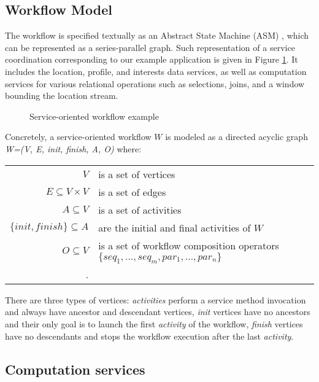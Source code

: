 \subsection{Workflow Model}\label{subsec:workflowModel}

The workflow is specified textually as an Abstract State Machine (ASM) \cite{Gurevich:1995:EAL:233976.233979}, which can be represented as a series-parallel graph. Such representation of a service coordination corresponding to our example application is given in Figure \ref{fig:servCoorExample}. It includes the location, profile, and interests data services, as well as computation services for various relational operations such as selections, joins, and a window bounding the location stream.
		
\begin{figure}
	\centering
		\caption{Service-oriented workflow example}
		\label{fig:servCoorExample}
\end{figure}

Concretely, a service-oriented workflow $W$ is modeled as a directed acyclic graph \textit{W=(V, E, init, finish, A, O)} where:
		\begin{center}
			\footnotesize
			\begin{tabular}{rp{5.5cm}}
				$V$                      & is a set of vertices \\
				$E \subseteq V \times V$ & is a set of edges \\
				$A \subseteq V$          & is a set of activities \\
				$\{init, finish\} \subseteq A$     & are the initial and final activities of $W$\\
				$O \subseteq V$          & is a set of workflow composition operators $\{seq_1,...,seq_m,par_1,...,par_n\}$\\.     
			\end{tabular}   
		\end{center}
There are three types of vertices: \textit{activities} perform a service method invocation and always have ancestor and descendant vertices, \textit{init} vertices have no ancestors and their only goal is to launch the first \textit{activity} of the workflow, \textit{finish} vertices have no descendants and stops the workflow execution after the last \textit{activity}.

\subsection{Computation services}\label{subsec:computationServices}

